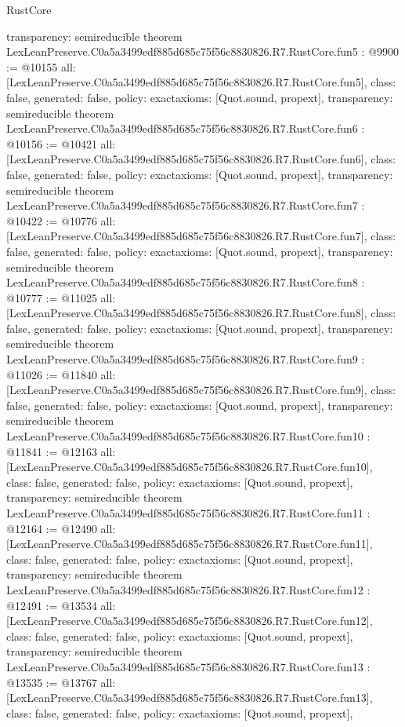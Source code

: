 \begin{lexlean}{RustCore}
\begin{coremodule}
{  transparency: semireducible
}
theorem LexLeanPreserve.C0a5a3499edf885d685c75f56c8830826.R7.RustCore.fun5 : @9900 := @10155 {
  all: [LexLeanPreserve.C0a5a3499edf885d685c75f56c8830826.R7.RustCore.fun5],
  class: false,
  generated: false,
  policy: exact{axioms: [Quot.sound, propext]},
  transparency: semireducible
}
theorem LexLeanPreserve.C0a5a3499edf885d685c75f56c8830826.R7.RustCore.fun6 : @10156 := @10421 {
  all: [LexLeanPreserve.C0a5a3499edf885d685c75f56c8830826.R7.RustCore.fun6],
  class: false,
  generated: false,
  policy: exact{axioms: [Quot.sound, propext]},
  transparency: semireducible
}
theorem LexLeanPreserve.C0a5a3499edf885d685c75f56c8830826.R7.RustCore.fun7 : @10422 := @10776 {
  all: [LexLeanPreserve.C0a5a3499edf885d685c75f56c8830826.R7.RustCore.fun7],
  class: false,
  generated: false,
  policy: exact{axioms: [Quot.sound, propext]},
  transparency: semireducible
}
theorem LexLeanPreserve.C0a5a3499edf885d685c75f56c8830826.R7.RustCore.fun8 : @10777 := @11025 {
  all: [LexLeanPreserve.C0a5a3499edf885d685c75f56c8830826.R7.RustCore.fun8],
  class: false,
  generated: false,
  policy: exact{axioms: [Quot.sound, propext]},
  transparency: semireducible
}
theorem LexLeanPreserve.C0a5a3499edf885d685c75f56c8830826.R7.RustCore.fun9 : @11026 := @11840 {
  all: [LexLeanPreserve.C0a5a3499edf885d685c75f56c8830826.R7.RustCore.fun9],
  class: false,
  generated: false,
  policy: exact{axioms: [Quot.sound, propext]},
  transparency: semireducible
}
theorem LexLeanPreserve.C0a5a3499edf885d685c75f56c8830826.R7.RustCore.fun10 : @11841 := @12163 {
  all: [LexLeanPreserve.C0a5a3499edf885d685c75f56c8830826.R7.RustCore.fun10],
  class: false,
  generated: false,
  policy: exact{axioms: [Quot.sound, propext]},
  transparency: semireducible
}
theorem LexLeanPreserve.C0a5a3499edf885d685c75f56c8830826.R7.RustCore.fun11 : @12164 := @12490 {
  all: [LexLeanPreserve.C0a5a3499edf885d685c75f56c8830826.R7.RustCore.fun11],
  class: false,
  generated: false,
  policy: exact{axioms: [Quot.sound, propext]},
  transparency: semireducible
}
theorem LexLeanPreserve.C0a5a3499edf885d685c75f56c8830826.R7.RustCore.fun12 : @12491 := @13534 {
  all: [LexLeanPreserve.C0a5a3499edf885d685c75f56c8830826.R7.RustCore.fun12],
  class: false,
  generated: false,
  policy: exact{axioms: [Quot.sound, propext]},
  transparency: semireducible
}
theorem LexLeanPreserve.C0a5a3499edf885d685c75f56c8830826.R7.RustCore.fun13 : @13535 := @13767 {
  all: [LexLeanPreserve.C0a5a3499edf885d685c75f56c8830826.R7.RustCore.fun13],
  class: false,
  generated: false,
  policy: exact{axioms: [Quot.sound, propext]},
}
\end{coremodule}
\end{lexlean}
